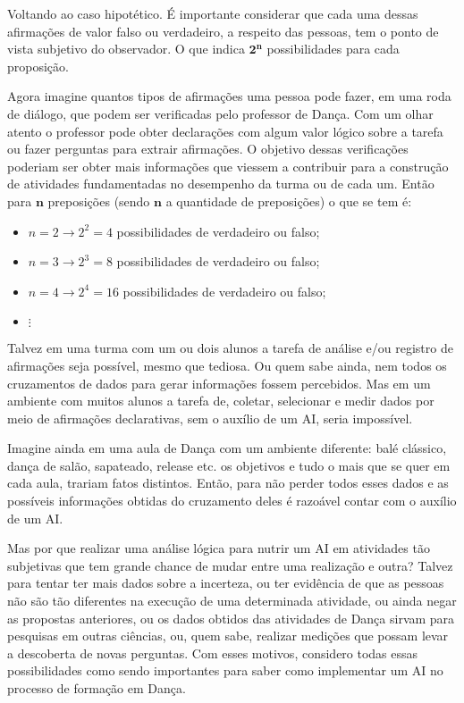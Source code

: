 Voltando ao caso hipotético. É importante considerar que cada uma dessas afirmações de valor falso ou verdadeiro, a respeito das pessoas, tem o ponto de vista subjetivo do observador. O que indica $ \textbf{2}^\textbf{n} $ possibilidades para cada proposição.

Agora imagine quantos tipos de afirmações uma pessoa pode fazer, em uma roda de diálogo, que podem ser verificadas pelo professor de Dança. Com um olhar atento o professor pode obter declarações com algum valor lógico sobre a tarefa ou fazer perguntas para extrair afirmações. O objetivo dessas verificações poderiam ser obter mais informações que viessem a contribuir para a construção de atividades fundamentadas no desempenho da turma ou de cada um. Então para $ \textbf{n} $ preposições (sendo $ \textbf{n} $ a quantidade de preposições)  o que se tem é:

\begin{itemize}
	\item  $n = 2 \longrightarrow 2^2 = 4 $ possibilidades de verdadeiro ou falso; 
	\item  $n = 3 \longrightarrow 2^3 = 8 $ possibilidades de verdadeiro ou falso;
	\item  $n = 4 \longrightarrow 2^4 = 16 $ possibilidades de verdadeiro ou falso;
	\item $ \vdots $
\end{itemize}


Talvez em uma turma com um ou dois alunos a tarefa de análise e/ou registro de afirmações seja possível, mesmo que tediosa. Ou quem sabe ainda, nem todos os cruzamentos de dados para gerar informações fossem percebidos. Mas em um ambiente com muitos alunos a tarefa de, coletar, selecionar e medir dados por meio de afirmações declarativas, sem o auxílio de um AI, seria impossível.

Imagine ainda em uma aula de Dança com um ambiente diferente: balé clássico, dança de salão, sapateado, release etc. os objetivos e tudo o mais que se quer em cada aula, trariam fatos distintos. Então, para não perder todos esses dados e as possíveis informações obtidas do cruzamento deles é razoável contar com o auxílio de um AI.

Mas por que realizar uma análise lógica para nutrir um AI em atividades tão subjetivas que tem grande chance de mudar entre uma realização e outra? Talvez para tentar ter mais dados sobre a incerteza, ou ter evidência de que as pessoas não são tão diferentes na execução de uma determinada atividade, ou ainda negar as propostas anteriores, ou os dados obtidos das atividades de Dança sirvam para pesquisas em outras ciências, ou, quem sabe, realizar medições que possam levar a descoberta de novas perguntas. Com esses motivos, considero todas essas possibilidades como sendo importantes para saber como implementar um AI no processo de formação em Dança.

